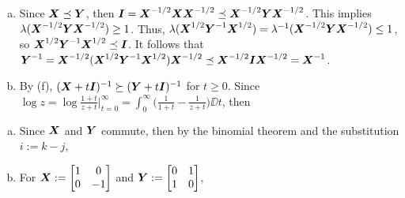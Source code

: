 \begin{answer}
\begin{enumerate}[(a)]
\item
Since $\boldsymbol{X}\preceq\boldsymbol{Y}$, then $\boldsymbol{I}=\boldsymbol{X}^{-1/2}\boldsymbol{X}\boldsymbol{X}^{-1/2}\preceq\boldsymbol{X}^{-1/2}\boldsymbol{Y}\boldsymbol{X}^{-1/2}$. This implies $\lambda(\boldsymbol{X}^{-1/2}\boldsymbol{Y}\boldsymbol{X}^{-1/2})\ge1$. Thus, $\lambda(\boldsymbol{X}^{1/2}\boldsymbol{Y}^{-1}\boldsymbol{X}^{1/2})=\lambda^{-1}(\boldsymbol{X}^{-1/2}\boldsymbol{Y}\boldsymbol{X}^{-1/2})\le1$, so $\boldsymbol{X}^{1/2}\boldsymbol{Y}^{-1}\boldsymbol{X}^{1/2}\preceq\boldsymbol{I}$. It follows that $\boldsymbol{Y}^{-1}=\boldsymbol{X}^{-1/2}(\boldsymbol{X}^{1/2}\boldsymbol{Y}^{-1}\boldsymbol{X}^{1/2})\boldsymbol{X}^{-1/2}\preceq\boldsymbol{X}^{-1/2}\boldsymbol{I}\boldsymbol{X}^{-1/2}=\boldsymbol{X}^{-1}$. 

\item
By (f), $(\boldsymbol{X}+t\boldsymbol{I})^{-1}\succeq(\boldsymbol{Y}+t\boldsymbol{I})^{-1}$ for $t\ge0$. Since $\log z=\log\frac{1+t}{z+t}\big|_{t=0}^\infty=\int_0^\infty\big(\frac1{1+t}-\frac1{z+t}\big)\DD t$, then
\end{enumerate}
\end{answer}

\begin{problem*}[Exercise 5.4.6]\label{ex5.4.6}

\end{problem*}
\begin{answer}
\begin{enumerate}[(a)]
\item
Since $\boldsymbol{X}$ and $\boldsymbol{Y}$ commute, then by the binomial theorem and the substitution $i:=k-j$,

\item
For $\boldsymbol{X}:=\begin{bmatrix}1&0\\0&-1\end{bmatrix}$ and $\boldsymbol{Y}:=\begin{bmatrix}0&1\\1&0\end{bmatrix}$,
\end{enumerate}
\end{answer}

